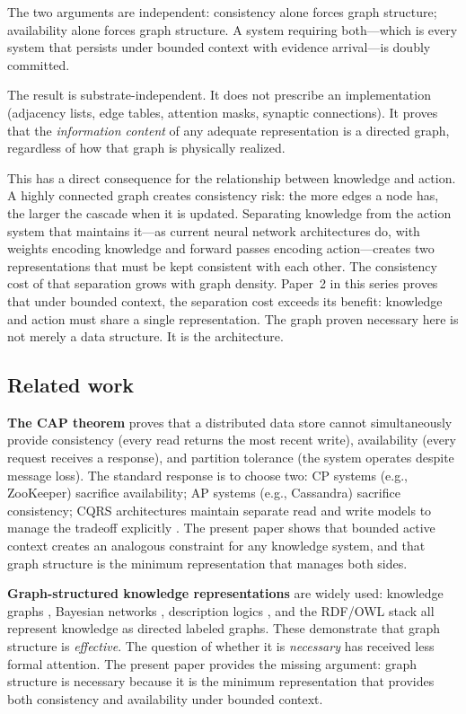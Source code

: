 \documentclass[11pt]{article}
\theoremstyle{definition}
\begin{document}
The two arguments are independent: consistency alone forces graph
structure; availability alone forces graph structure. A system
requiring both---which is every system that persists under bounded
context with evidence arrival---is doubly committed.

The result is substrate-independent. It does not prescribe an
implementation (adjacency lists, edge tables, attention masks, synaptic
connections). It proves that the \emph{information content} of any
adequate representation is a directed graph, regardless of how that
graph is physically realized.

This has a direct consequence for the relationship between knowledge
and action. A highly connected graph creates consistency risk:
the more edges a node has, the larger the cascade when it is
updated. Separating knowledge from the action system that maintains
it---as current neural network architectures do, with weights
encoding knowledge and forward passes encoding action---creates two
representations that must be kept consistent with each other.
The consistency cost of that separation grows with graph density.
Paper~2 in this series \cite{McCarthy2026b} proves that under
bounded context, the separation cost exceeds its benefit: knowledge
and action must share a single representation. The graph proven
necessary here is not merely a data structure. It is the
architecture.

\subsection{Related work}

\textbf{The CAP theorem} \cite{Brewer2000, Gilbert2002} proves that a
distributed data store cannot simultaneously provide consistency
(every read returns the most recent write), availability (every
request receives a response), and partition tolerance (the system
operates despite message loss). The standard response is to choose
two: CP systems (e.g., ZooKeeper) sacrifice availability; AP systems
(e.g., Cassandra) sacrifice consistency; CQRS architectures maintain
separate read and write models to manage the tradeoff explicitly
\cite{Young2010}. The present paper shows that bounded active context
creates an analogous constraint for any knowledge system, and that
graph structure is the minimum representation that manages both sides.

\textbf{Graph-structured knowledge representations} are widely used:
knowledge graphs \cite{Hogan2021}, Bayesian networks \cite{Pearl1988},
description logics \cite{BaaderCalvaneseEtAl2003}, and the
RDF/OWL stack \cite{BernersLee2001} all represent knowledge as directed
labeled graphs. These demonstrate that graph structure is
\emph{effective}. The question of whether it is \emph{necessary} has
received less formal attention. The present paper provides the missing
argument: graph structure is necessary because it is the minimum
representation that provides both consistency and availability under
bounded context.
\end{document}
